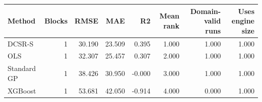 \begin{tabular}{lrrrrrrr}
\toprule
Method & Blocks & RMSE & MAE & R2 & Mean rank & Domain-valid runs & Uses engine size \\
\midrule
DCSR-S & 1 & 30.190 & 23.509 & 0.395 & 1.000 & 1.000 & 1.000 \\
OLS & 1 & 32.307 & 25.457 & 0.307 & 2.000 & 1.000 & 1.000 \\
Standard GP & 1 & 38.426 & 30.950 & -0.000 & 3.000 & 1.000 & 1.000 \\
XGBoost & 1 & 53.681 & 42.050 & -0.914 & 4.000 & 0.000 & 1.000 \\
\bottomrule
\end{tabular}
